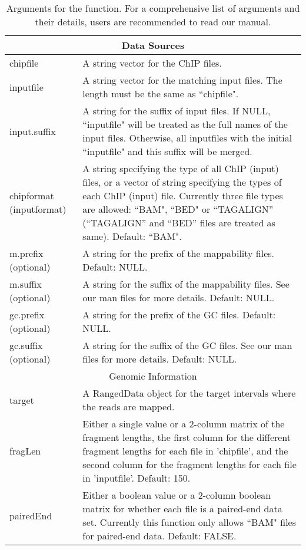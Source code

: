 \documentclass[a4paper,10pt]{article}\usepackage[]{graphicx}\usepackage[]{color}
\begin{document}
\begin{table}
  \centering
  \caption{Arguments for the  function. For a comprehensive list of arguments and their details, users are recommended to read our manual.}\label{tbl:arguments}
  \begin{tabular}{p{2cm}p{10cm}}
    \hline
    \multicolumn{2}{c}{Data Sources}\\
    \hline
    chipfile & A string vector for the ChIP files.\\
    inputfile & A string vector for the matching input files. The length must be the same as ``chipfile".\\
    input.suffix & A string for the suffix of input files. If NULL, ``inputfile" will be treated as the full names of the input files. Otherwise, all inputfiles with the initial ``inputfile" and this suffix will be merged.\\
    chipformat (inputformat) & A string specifying the type of all ChIP (input) files, or a vector of string specifying the types of each ChIP (input) file.  Currently three file types are allowed: ``BAM", ``BED" or ``TAGALIGN'' (``TAGALIGN'' and ``BED'' files are treated as same).  Default: ``BAM".\\
    m.prefix (optional) & A string for the prefix of the mappability files. Default: NULL.\\
    m.suffix (optional) & A string for the suffix of the mappability files. See our man files for more details. Default: NULL.\\
    gc.prefix (optional) & A string for the prefix of the GC files. Default: NULL.\\
    gc.suffix (optional) & A string for the suffix of the GC files.  See our man files for more details. Default: NULL.\\
    \hline
    \multicolumn{2}{c}{Genomic Information}\\
    \hline
    target & A RangedData object for the target intervals where the reads are mapped.\\
    fragLen & Either a single value or a 2-column matrix of the fragment lengths, the first column for the different fragment lengths for each file in 'chipfile', and the second column for the fragment lengths for each file in 'inputfile'. Default: 150.\\
    pairedEnd & Either a boolean value or a 2-column boolean matrix for  whether each file is a paired-end data set. Currently this function only allows ``BAM" files for paired-end data. Default: FALSE.\\

\end{tabular}
\end{table}
\end{document}
